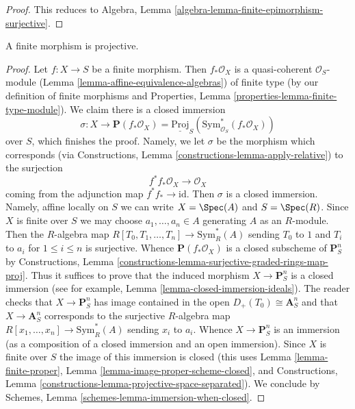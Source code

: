 \begin{proof}
This reduces to
Algebra, Lemma \ref{algebra-lemma-finite-epimorphism-surjective}.
\end{proof}

\begin{lemma}
\label{lemma-finite-projective}
A finite morphism is projective.
\end{lemma}

\begin{proof}
Let $f : X \to S$ be a finite morphism. Then $f_*\mathcal{O}_X$ is
a quasi-coherent $\mathcal{O}_S$-module
(Lemma \ref{lemma-affine-equivalence-algebras})
of finite type
(by our definition of finite morphisms and
Properties, Lemma \ref{properties-lemma-finite-type-module}).
We claim there is a closed immersion
$$
\sigma :
X
\longrightarrow
\mathbf{P}(f_*\mathcal{O}_X) =
\underline{\text{Proj}}_S(\text{Sym}^*_{\mathcal{O}_S}(f_*\mathcal{O}_X))
$$
over $S$, which finishes
the proof. Namely, we let $\sigma$ be the morphism which corresponds
(via Constructions, Lemma \ref{constructions-lemma-apply-relative})
to the surjection
$$
f^*f_*\mathcal{O}_X \longrightarrow \mathcal{O}_X
$$
coming from the adjunction map $f^*f_* \to \text{id}$. Then $\sigma$
is a closed immersion. Namely, affine locally on $S$ we can write
$X = \Spec(A)$ and $S = \Spec(R)$. Since $X$ is finite over $S$
we may choose $a_1, \ldots, a_n \in A$ generating $A$ as an $R$-module.
Then the $R$-algebra map $R[T_0, T_1, \ldots, T_n] \to \text{Sym}_R^*(A)$
sending $T_0$ to $1$ and $T_i$ to $a_i$ for $1 \leq i \leq n$ is surjective.
Whence $\mathbf{P}(f_*\mathcal{O}_X)$ is a closed subscheme of
$\mathbf{P}^n_S$ by Constructions, Lemma
\ref{constructions-lemma-surjective-graded-rings-map-proj}.
Thus it suffices to prove that the induced morphism
$X \to \mathbf{P}^n_S$ is a closed immersion
(see for example, Lemma \ref{lemma-closed-immersion-ideals}).
The reader checks that $X \to \mathbf{P}^n_S$ has image contained
in the open $D_+(T_0) \cong \mathbf{A}^n_S$ and that $X \to \mathbf{A}^n_S$
corresponds to the surjective $R$-algebra map
$R[x_1, \ldots, x_n] \to \text{Sym}_R^*(A)$ sending $x_i$ to $a_i$.
Whence $X \to \mathbf{P}^n_S$ is an immersion (as a composition
of a closed immersion and an open immersion). Since
$X$ is finite over $S$ the image of this immersion is closed
(this uses Lemma \ref{lemma-finite-proper},
Lemma \ref{lemma-image-proper-scheme-closed}, and
Constructions, Lemma \ref{constructions-lemma-projective-space-separated}).
We conclude by Schemes, Lemma \ref{schemes-lemma-immersion-when-closed}.
\end{proof}







